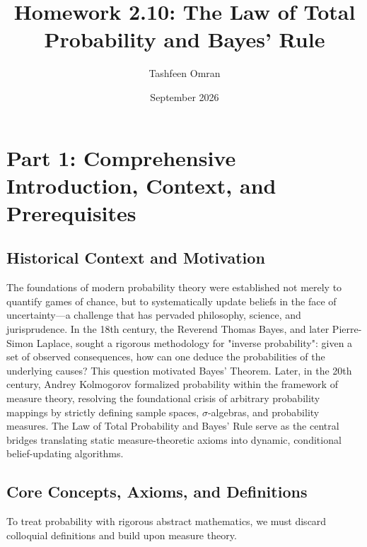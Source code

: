 \documentclass[12pt]{article}
\title{\textbf{Homework 2.10: The Law of Total Probability and Bayes' Rule}}
\author{Tashfeen Omran}
\date{September 2026}
\begin{document}
\maketitle
\tableofcontents
\newpage

\section{Part 1: Comprehensive Introduction, Context, and Prerequisites}

\subsection{Historical Context and Motivation}
The foundations of modern probability theory were established not merely to quantify games of chance, but to systematically update beliefs in the face of uncertainty—a challenge that has pervaded philosophy, science, and jurisprudence. In the 18th century, the Reverend Thomas Bayes, and later Pierre-Simon Laplace, sought a rigorous methodology for "inverse probability": given a set of observed consequences, how can one deduce the probabilities of the underlying causes? This question motivated Bayes' Theorem. Later, in the 20th century, Andrey Kolmogorov formalized probability within the framework of measure theory, resolving the foundational crisis of arbitrary probability mappings by strictly defining sample spaces, $\sigma$-algebras, and probability measures. The Law of Total Probability and Bayes' Rule serve as the central bridges translating static measure-theoretic axioms into dynamic, conditional belief-updating algorithms.

\subsection{Core Concepts, Axioms, and Definitions}
To treat probability with rigorous abstract mathematics, we must discard colloquial definitions and build upon measure theory. 
\end{document}
